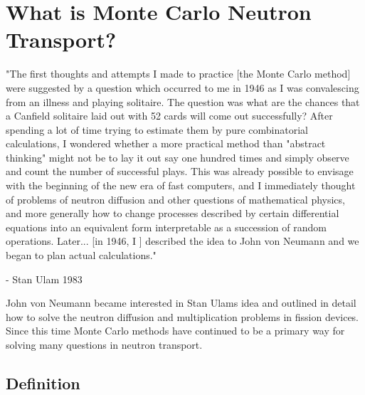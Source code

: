 \section{ \textbf{What is Monte Carlo Neutron Transport?}}

\begin{displayquote}
"The first thoughts and attempts I made to practice [the Monte Carlo method] were suggested by a question which occurred to me in 1946 as I was convalescing from an illness and playing solitaire. The question was what are the chances that a Canfield solitaire laid out with 52 cards will come out successfully? After spending a lot of time trying to estimate them by pure combinatorial calculations, I wondered whether a more practical method than "abstract thinking" might not be to lay it out say one hundred times and simply observe and count the number of successful plays. This was already possible to envisage with the beginning of the new era of fast computers, and I immediately thought of problems of neutron diffusion and other questions of mathematical physics, and more generally how to change processes described by certain differential equations into an equivalent form interpretable as a succession of random operations. Later... [in 1946, I ] described the idea to John von Neumann and we began to plan actual calculations."
\end{displayquote}
\begin{displayquote}
- Stan Ulam 1983 ~\cite{theMCM}
\end{displayquote}

John von Neumann became interested in Stan Ulams idea and outlined in detail how to solve the neutron diffusion and multiplication problems in fission devices.
%
Since this time Monte Carlo methods have continued to be a primary way for solving many questions in neutron transport. ~\cite{theMCM}
%

\subsection{ \textbf{ Definition} }

